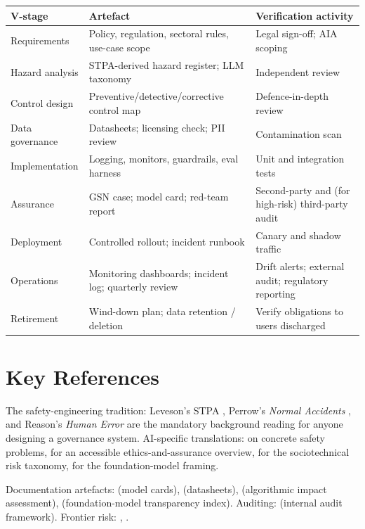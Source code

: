 \begin{center}
\small
\begin{tabular}{p{4.3cm}|p{4.3cm}|p{4.3cm}}
\textbf{V-stage} & \textbf{Artefact} & \textbf{Verification activity}\\\hline
Requirements & Policy, regulation, sectoral rules, use-case scope & Legal sign-off; AIA scoping \\
Hazard analysis & STPA-derived hazard register; LLM taxonomy & Independent review \\
Control design & Preventive/detective/corrective control map & Defence-in-depth review \\
Data governance & Datasheets; licensing check; PII review & Contamination scan \\
Implementation & Logging, monitors, guardrails, eval harness & Unit and integration tests \\
Assurance & GSN case; model card; red-team report & Second-party and (for high-risk) third-party audit \\
Deployment & Controlled rollout; incident runbook & Canary and shadow traffic \\
Operations & Monitoring dashboards; incident log; quarterly review & Drift alerts; external audit; regulatory reporting \\
Retirement & Wind-down plan; data retention / deletion & Verify obligations to users discharged \\
\end{tabular}
\end{center}

\section{Key References}

The safety-engineering tradition: Leveson's STPA
\citep{leveson2011engineering}, Perrow's \emph{Normal Accidents}
\citep{perrow1999normal}, and Reason's \emph{Human Error}
\citep{reason1990human} are the mandatory background reading
for anyone designing a governance system. AI-specific
translations: \citet{amodei2016concrete} on concrete safety
problems, \citet{leslie2021understanding} for an accessible
ethics-and-assurance overview, \citet{weidinger2021ethical,
weidinger2023sociotechnical} for the sociotechnical risk
taxonomy, \citet{bommasani2021opportunities} for the
foundation-model framing.

Documentation artefacts: \citet{mitchell2019modelcards} (model
cards), \citet{gebru2021datasheets} (datasheets),
\citet{metcalf2021algorithmic} (algorithmic impact assessment),
\citet{bommasani2023transparency} (foundation-model transparency
index). Auditing: \citet{raji2020closing} (internal audit
framework). Frontier risk: \citet{shevlane2023model},
\citet{anderljung2023frontier}.


